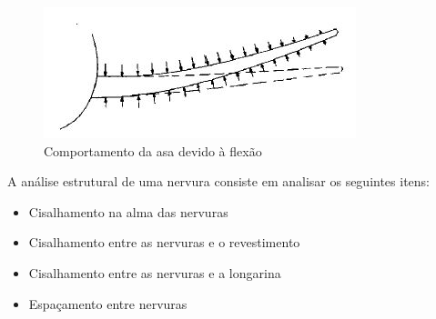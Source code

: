 \begin{figure}
\centering
\includegraphics[width=\textwidth]{images/parte4/nervura2}
\caption{Comportamento da asa devido à flexão}
\label{fig:nervura_asa2}
\end{figure}

A análise estrutural de uma nervura consiste em analisar os seguintes itens:
\begin{itemize}
  \item Cisalhamento na alma das nervuras
  \item Cisalhamento entre as nervuras e o revestimento
  \item Cisalhamento entre as nervuras e a longarina
  \item Espaçamento entre nervuras
\end{itemize}
